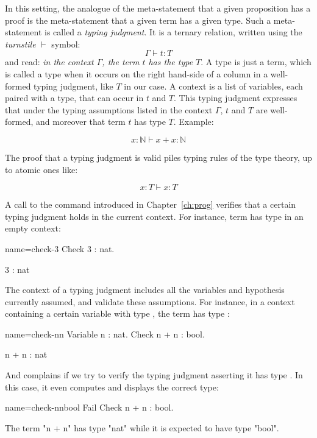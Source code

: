 In this setting, the analogue of the meta-statement
that a given proposition has a proof is the meta-statement that a
given term has a given type. Such a meta-statement is called a
\emph{typing judgment}. It is a ternary relation, written using the
\emph{turnstile} $\vdash$ symbol:
$$\Gamma \vdash t : T$$
and read:
\emph{in the context $\Gamma$, the term $t$ has the type $T$}. A type
is just a term, which is called a type when it occurs on the right
hand-side of a column in a well-formed typing judgment, like $T$ in
our case. A context is a list of variables, each paired with a type,
that can occur in $t$ and $T$. This typing judgment expresses that
under the typing assumptions listed in the context $\Gamma$, $t$ and
$T$ are well-formed, and moreover that term $t$ has type $T$. Example:

$$x : \mathbb{N} \vdash x + x : \mathbb{N}$$


The proof that a typing judgment is valid piles typing rules of the
type theory, up to atomic ones like:

$$x : T \vdash x : T$$


A call to the  command introduced in Chapter~\ref{ch:prog} 
verifies that a certain typing judgment holds in the current
context. For instance, term  has type  in an empty context:

\begin{coq-left}{name=check-3}{}
Check 3 : nat.
\end{coq-left}
\begin{coqout-right}
3 : nat
\end{coqout-right}

The context of a typing judgment includes all the variables and
hypothesis currently assumed, and validate these assumptions.
For instance, in a context containing a certain variable  with
type , the term  has type :

\begin{coq-left}{name=check-nn}{}
Variable n : nat.
Check n + n : bool.
\end{coq-left}
\begin{coqout-right}
n + n : nat
\end{coqout-right}

And \Coq{} complains if we try to verify the typing judgment asserting it
has type . In this case, it even computes and displays the
correct type:

\begin{coq-left}{name=check-nnbool}{}
Fail Check n + n : bool.

\end{coq-left}
\begin{coqout-right}
The term "n + n" has type "nat" while it is expected to have type "bool".
\end{coqout-right}

